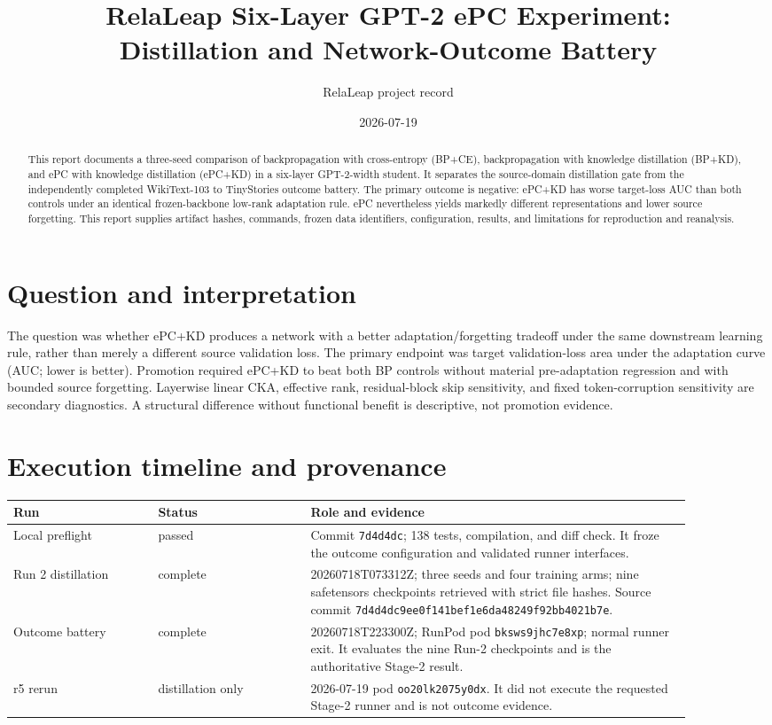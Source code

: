 \documentclass[11pt]{article}
\title{RelaLeap Six-Layer GPT-2 ePC Experiment:\\Distillation and Network-Outcome Battery}
\author{RelaLeap project record}
\date{2026-07-19}
\begin{document}
\maketitle

\begin{abstract}
This report documents a three-seed comparison of backpropagation with cross-entropy (BP+CE), backpropagation with knowledge distillation (BP+KD), and ePC with knowledge distillation (ePC+KD) in a six-layer GPT-2-width student. It separates the source-domain distillation gate from the independently completed WikiText-103 to TinyStories outcome battery. The primary outcome is negative: ePC+KD has worse target-loss AUC than both controls under an identical frozen-backbone low-rank adaptation rule. ePC nevertheless yields markedly different representations and lower source forgetting. This report supplies artifact hashes, commands, frozen data identifiers, configuration, results, and limitations for reproduction and reanalysis.
\end{abstract}

\section{Question and interpretation}
The question was whether ePC+KD produces a network with a better adaptation/forgetting tradeoff under the same downstream learning rule, rather than merely a different source validation loss. The primary endpoint was target validation-loss area under the adaptation curve (AUC; lower is better). Promotion required ePC+KD to beat both BP controls without material pre-adaptation regression and with bounded source forgetting. Layerwise linear CKA, effective rank, residual-block skip sensitivity, and fixed token-corruption sensitivity are secondary diagnostics. A structural difference without functional benefit is descriptive, not promotion evidence.

\section{Execution timeline and provenance}
\begin{longtable}{p{0.19\linewidth}p{0.20\linewidth}p{0.50\linewidth}}
\toprule
Run & Status & Role and evidence \\
\midrule
\endhead
Local preflight & passed & Commit \texttt{7d4d4dc}; 138 tests, compilation, and diff check. It froze the outcome configuration and validated runner interfaces. \\
Run 2 distillation & complete & 20260718T073312Z; three seeds and four training arms; nine safetensors checkpoints retrieved with strict file hashes. Source commit \texttt{7d4d4dc9ee0f141bef1e6da48249f92bb4021b7e}. \\
Outcome battery & complete & 20260718T223300Z; RunPod pod \texttt{bksws9jhc7e8xp}; normal runner exit. It evaluates the nine Run-2 checkpoints and is the authoritative Stage-2 result. \\
r5 rerun & distillation only & 2026-07-19 pod \texttt{oo20lk2075y0dx}. It did not execute the requested Stage-2 runner and is not outcome evidence. \\
\bottomrule
\end{longtable}
\end{document}
